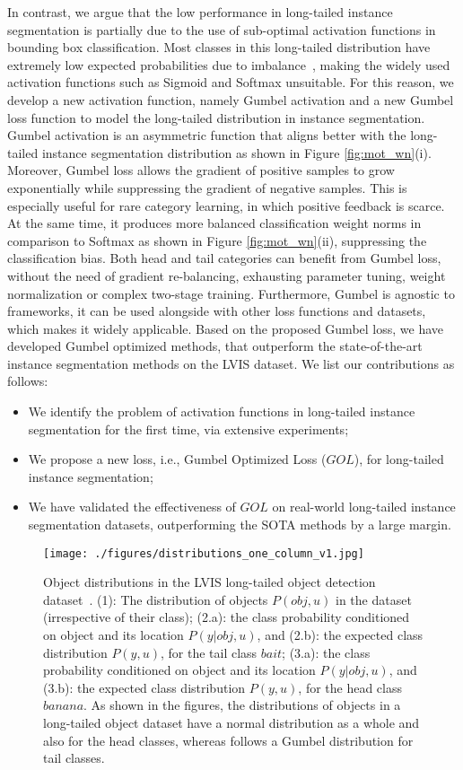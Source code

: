 \documentclass[runningheads]{llncs}
\begin{document}
In contrast, we argue that the low performance in long-tailed instance segmentation is partially due to the use of sub-optimal activation functions in bounding box classification. Most classes in this long-tailed distribution have extremely low expected probabilities due to imbalance~\cite{oksuz2020imbalance}, making the widely used activation functions such as Sigmoid and Softmax unsuitable.
For this reason, we develop a new activation function, namely Gumbel activation and a new Gumbel loss function to model the long-tailed distribution in instance segmentation. Gumbel activation is an asymmetric function that aligns better with the long-tailed instance segmentation distribution as shown in Figure \ref{fig:mot_wn}(i). Moreover, Gumbel loss allows the gradient of positive samples to grow exponentially while suppressing the gradient of negative samples. This is especially useful for rare category learning, in which positive feedback is scarce. At the same time, it produces more balanced classification weight norms in comparison to Softmax as shown in Figure \ref{fig:mot_wn}(ii), suppressing the classification bias. Both head and tail categories can benefit from Gumbel loss, without the need of gradient re-balancing, exhausting parameter tuning, weight normalization or complex two-stage training. Furthermore, Gumbel is agnostic to frameworks, it can be used alongside with other loss functions and datasets, which makes it widely applicable.
Based on the proposed Gumbel loss, we have developed Gumbel optimized methods, that outperform the state-of-the-art instance segmentation methods on the LVIS \cite{gupta2019lvis} dataset. We list our contributions as follows:
\begin{itemize}
    \item We identify the problem of activation functions in long-tailed instance segmentation for the first time, via extensive experiments;
    \item We propose a new loss, i.e., Gumbel Optimized Loss ($GOL$), for long-tailed instance segmentation;
    \item We have validated the effectiveness of $GOL$ on real-world long-tailed instance segmentation datasets, outperforming the SOTA methods by a large margin.
\end{itemize}
\begin{figure*}[t]
    \centering
    \texttt{[image: ./figures/distributions\_one\_column\_v1.jpg]}
    \caption{Object distributions in the LVIS long-tailed object detection dataset~\cite{gupta2019lvis}. (1): The distribution of objects $P(obj,u)$ in the dataset (irrespective of their class); (2.a): the class probability conditioned on object and its location $P(y|obj,u)$, and (2.b): the expected class distribution $P(y,u)$, for the tail class $bait$;
    (3.a): the class probability conditioned on object and its location $P(y|obj,u)$, and (3.b): the expected class distribution $P(y,u)$, for the head class $banana$. As shown in the figures, the distributions of objects in a long-tailed object dataset have a normal distribution as a whole and also for the head classes, whereas follows a Gumbel distribution for tail classes.}
\label{fig:obj_det_distribution}
\end{figure*}
\end{document}
